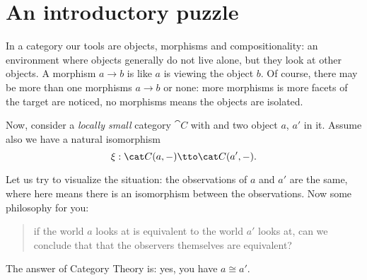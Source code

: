 
\section{An introductory puzzle}

In a category our tools are objects, morphisms and compositionality: an environment where objects generally do not live alone, but they look at other objects. A morphism \(a \to b\) is like \(a\) is viewing the object \(b\). Of course, there may be more than one morphisms \(a \to b\) or none: more morphisms is more facets of the target are noticed, no morphisms means the objects are isolated.

Now, consider a {\em locally small} category \(\cat C\) with and two object \(a\), \(a'\) in it. Assume also we have a natural isomorphism
\begin{equation}
\xi : \cat C (a, -) \tto \cat C(a', -) . \label{equation:IsoOfLeftHoms}
\end{equation}

Let us try to visualize the situation: the observations of \(a\) and \(a'\) are the same, where  here means there is an isomorphism between the observations. Now some philosophy for you:
%
\begin{quotation}
if the world \(a\) looks at is equivalent to the world \(a'\) looks at, can we conclude that that the observers themselves are equivalent?
\end{quotation}
%
The answer of Category Theory is: yes, you have \(a \cong a'\).

